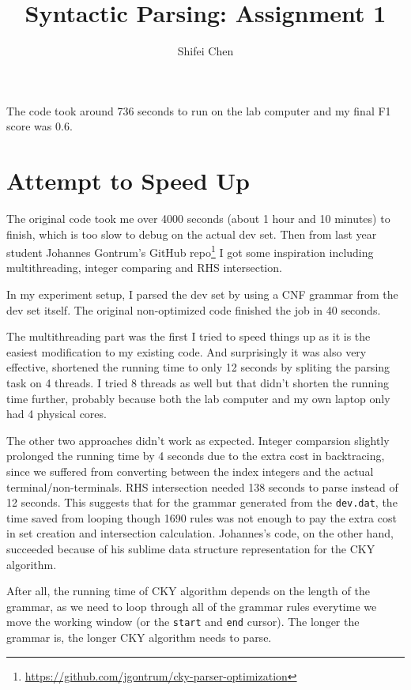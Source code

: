 \documentclass[11pt]{article} %
\title{{\LARGE Syntactic Parsing: Assignment 1}\\[1.5mm]} %
\author{Shifei Chen} %
\begin{document}
\maketitle

The code took around 736 seconds to run on the lab computer and my final F1 score was 0.6.

\section*{Attempt to Speed Up}

The original code took me over 4000 seconds (about 1 hour and 10 minutes) to finish, which is too slow to debug on the actual dev set. Then from last year student Johannes Gontrum's GitHub repo\footnote{\url{https://github.com/jgontrum/cky-parser-optimization}} I got some inspiration including multithreading, integer comparing and RHS intersection.

In my experiment setup, I parsed the dev set by using a CNF grammar from the dev set itself. The original non-optimized code finished the job in 40 seconds.

The multithreading part was the first I tried to speed things up as it is the easiest modification to my existing code. And surprisingly it was also very effective, shortened the running time to only 12 seconds by spliting the parsing task on 4 threads. I tried 8 threads as well but that didn't shorten the running time further, probably because both the lab computer and my own laptop only had 4 physical cores.

The other two approaches didn't work as expected. Integer comparsion slightly prolonged the running time by 4 seconds due to the extra cost in backtracing, since we suffered from converting between the index integers and the actual terminal/non-terminals. RHS intersection needed 138 seconds to parse instead of 12 seconds. This suggests that for the grammar generated from the \verb|dev.dat|, the time saved from looping though 1690 rules was not enough to pay the extra cost in set creation and intersection calculation. Johannes's code, on the other hand, succeeded because of his sublime data structure representation for the CKY algorithm. 

After all, the running time of CKY algorithm depends on the length of the grammar, as we need to loop through all of the grammar rules everytime we move the working window (or the \verb|start| and \verb|end| cursor). The longer the grammar is, the longer CKY algorithm needs to parse.\cite{Dunlop_optimizingcyk}

\printbibliography
\end{document}
